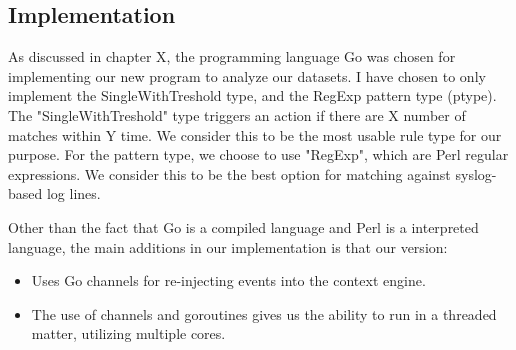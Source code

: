 \iffalse
\section{The Go programming language}

\com{Her er en rask intro, argumentasjonen hvorfor vi valgte dette finner du i eksperiment XYZ}
\todo{Why did we choose Go?} \com{Dette er ikke teori/bakgrunn, men mer et metodevalg.}
\subsection{Goroutines}
\todo{What are these lightweight Go threads?}\\
Goroutines are lightweight threads that are handled by the Go runtime.
\subsection{Channels}

\todo{What are channels? What are some of the considerations we have to take when working with them?}\\
\todo{Are there any best practices?}\\
Channels are the preferred way to communicate between Goroutines in Go.

\subsection{Concurrency vs parallelism}
\todo{Discuss why Go is concurrent, but not parallel}
\fi

\subsection{Implementation}
As discussed in chapter X, the programming language Go was chosen for implementing our new program to analyze our datasets. I have chosen to only implement the SingleWithTreshold type, and the RegExp pattern type (ptype). The "SingleWithTreshold" type triggers an action if there are X number of matches within Y time. We consider this to be the most usable rule type for our purpose.  For the pattern type, we choose to use "RegExp", which are Perl regular expressions. We consider this to be the best option for matching against syslog-based log lines.

Other than the fact that Go is a compiled language and Perl is a interpreted language, the main additions in our implementation is that our version:
\begin{itemize}
    \item Uses Go channels for re-injecting events into the context engine.
    \item The use of channels and goroutines gives us the ability to run in a threaded matter, utilizing multiple cores.
\end{itemize}

